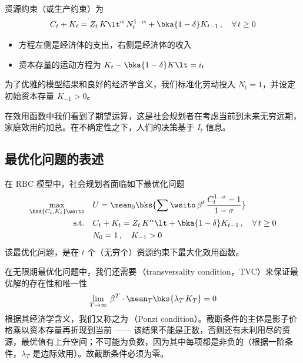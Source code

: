 
资源约束（或生产约束）为
\begin{align}
    C_t+K_t=Z_t\,K\lt^\alpha\,N_t^{1-\alpha}+\bka{1-\delta}K_{t-1}\,, \quad \forall\,t\geq 0
\end{align}
\begin{itemize}
    \item 方程左侧是经济体的支出，右侧是经济体的收入
    \item 资本存量的运动方程为 \(K_t-\bka{1-\delta}K\lt=i_t\)
\end{itemize}


为了优雅的模型结果和良好的经济学含义，我们标准化劳动投入 \(N_t=1\)，并设定初始资本存量 \(K_{-1}>0\)。


在效用函数中我们看到了期望运算，这是社会规划者在考虑当前到未来无穷远期，家庭效用的加总。在不确定性之下，人们的决策基于 \(I_t\) 信息。


\subsection{最优化问题的表述}\label{subsec:OptProbForm}

在 RBC 模型中，社会规划者面临如下最优化问题
\begin{align*}
    \max_{\bkd{C_t,K_t}\wsito} \quad & U= \mean_0\bks{\sum\wsito \,\beta^t\,\dfrac{C_t^{1-\sigma}-1}{1-\sigma}} \\
    \text{s.t.} \quad & C_t+K_t=Z_t\,K^\alpha\lt+\bka{1-\delta}K_{t-1}\,, \quad \forall\, t\geq 0 \\
    & N_0=1\,,\quad K_{-1}>0
\end{align*}
该最优化问题，是在 \(t\) 个（无穷个）资源约束下最大化效用函数。

在无限期最优化问题中，我们还需要\,（transversality condition，TVC）来保证最优解的存在性和唯一性
\begin{align}
    \lim_{T\to\infty}\,\beta^T\cdot\mean_T\bks{\lambda_T\,K_T}=0
\end{align}
根据其经济学含义，我们又称之为\,（Ponzi condition）。截断条件的主体是影子价格乘以资本存量再折现到当前 —— 该结果不能是正数，否则还有未利用尽的资源，最优值有上升空间；不可能为负数，因为其中每项都是非负的（根据一阶条件，\(\lambda_T\) 是边际效用）。故截断条件必须为零。

